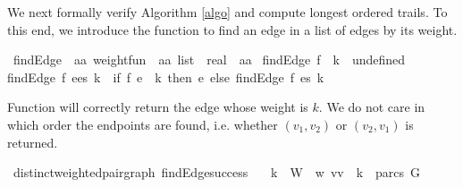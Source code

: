 \begin{isabellebody}
%
\isadelimproof
%
\endisadelimproof
%
\isadelimproof
%
\endisadelimproof
%
\isatagproof
%
\endisatagproof
{\isafoldproof}%
%
\isadelimproof
%
\endisadelimproof
%
\isadelimproof
%
\endisadelimproof
%
\isatagproof
%
\endisatagproof
{\isafoldproof}%
%
\isadelimproof
%
\endisadelimproof
%
\isadelimdocument
%
\endisadelimdocument
%
\isatagdocument
%
\isamarkuptrue%
%
\endisatagdocument
{\isafolddocument}%
%
\isadelimdocument
%
\endisadelimdocument
%
\begin{isamarkuptext}%
\label{compAlgo}We next formally verify Algorithm \ref{algo} and compute longest ordered trails. To this end, 
we introduce the function  to find an edge in a list of edges by its weight.%
\end{isamarkuptext}\isamarkuptrue%
\isamarkupfalse%
\ findEdge\ {\isacharcolon}{\isacharcolon}\ {\isachardoublequoteopen}{\isacharparenleft}{\isacharprime}a{\isasymtimes}{\isacharprime}a{\isacharparenright}\ weight{\isacharunderscore}fun\ {\isasymRightarrow}\ {\isacharparenleft}{\isacharprime}a{\isasymtimes}{\isacharprime}a{\isacharparenright}\ list\ {\isasymRightarrow}\ real\ {\isasymRightarrow}\ {\isacharparenleft}{\isacharprime}a{\isasymtimes}{\isacharprime}a{\isacharparenright}{\isachardoublequoteclose}\ \isanewline
{\isachardoublequoteopen}findEdge\ f\ {\isacharbrackleft}{\isacharbrackright}\ k\ {\isacharequal}\ undefined{\isachardoublequoteclose}\ {\isacharbar}\isanewline
{\isachardoublequoteopen}findEdge\ f\ {\isacharparenleft}e{\isacharhash}es{\isacharparenright}\ k\ {\isacharequal}\ {\isacharparenleft}if\ f\ e\ {\isacharequal}\ k\ then\ e\ else\ findEdge\ f\ es\ k{\isacharparenright}{\isachardoublequoteclose}%
\isadelimproof
%
\endisadelimproof
%
\isatagproof
%
\endisatagproof
{\isafoldproof}%
%
\isadelimproof
%
\endisadelimproof
%
\begin{isamarkuptext}%
Function  will correctly return the edge whose weight is $k$. We do not care in which order the endpoints
are found, i.e. whether $(v_1,v_2)$ or $(v_2,v_1)$ is returned.%
\end{isamarkuptext}\isamarkuptrue%
\isamarkupfalse%
{\isacharparenleft}\ distinct{\isacharunderscore}weighted{\isacharunderscore}pair{\isacharunderscore}graph{\isacharparenright}\ findEdge{\isacharunderscore}success{\isacharcolon}\isanewline
\ \ \ {\isachardoublequoteopen}k\ {\isasymin}\ W{\isachardoublequoteclose}\ \ {\isachardoublequoteopen}w\ {\isacharparenleft}vv\ {\isacharequal}\ k{\isachardoublequoteclose}\ \ {\isachardoublequoteopen}{\isacharparenleft}parcs\ G{\isacharparenright}\ {\isasymnoteq}\ {\isacharbraceleft}{\isacharbraceright}{\isachardoublequoteclose}\ \isanewline

\end{isabellebody}
